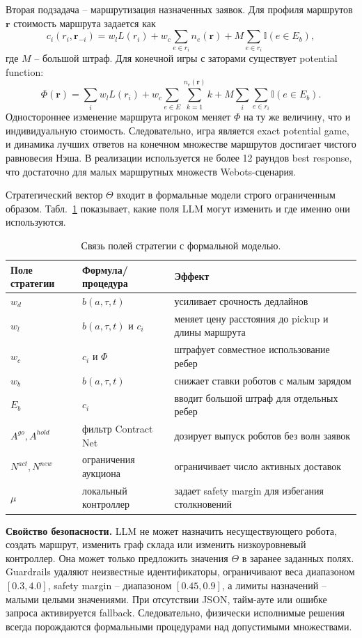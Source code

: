 \documentclass[runningheads]{llncs}
\begin{document}
Вторая подзадача -- маршрутизация назначенных заявок. Для профиля маршрутов $\mathbf r$ стоимость маршрута задается как
\[
c_i(r_i,\mathbf r_{-i}) =
w_l L(r_i)+w_c\sum_{e\in r_i} n_e(\mathbf r)+
M\sum_{e\in r_i}\mathbb{I}(e\in E_b),
\]
где $M$ -- большой штраф. Для конечной игры с заторами существует potential function:
\[
\Phi(\mathbf r)=
\sum_i w_l L(r_i)+
w_c\sum_{e\in E}\sum_{k=1}^{n_e(\mathbf r)}k+
M\sum_i\sum_{e\in r_i}\mathbb{I}(e\in E_b).
\]
Одностороннее изменение маршрута игроком меняет $\Phi$ на ту же величину, что и индивидуальную стоимость. Следовательно, игра является exact potential game, и динамика лучших ответов на конечном множестве маршрутов достигает чистого равновесия Нэша. В реализации используется не более 12 раундов best response, что достаточно для малых маршрутных множеств Webots-сценария.

Стратегический вектор $\Theta$ входит в формальные модели строго ограниченным образом. Табл.~\ref{tab:strategy-map} показывает, какие поля LLM могут изменить и где именно они используются.

\begin{table}[!htbp]
\centering
\caption{Связь полей стратегии с формальной моделью.}
\label{tab:strategy-map}
\scriptsize
\begin{tabular}{p{}p{}p{}}
\toprule
Поле стратегии & Формула/процедура & Эффект \\
\midrule
$w_d$ & $b(a,\tau,t)$ & усиливает срочность дедлайнов \\
$w_l$ & $b(a,\tau,t)$ и $c_i$ & меняет цену расстояния до pickup и длины маршрута \\
$w_c$ & $c_i$ и $\Phi$ & штрафует совместное использование ребер \\
$w_b$ & $b(a,\tau,t)$ & снижает ставки роботов с малым зарядом \\
$E_b$ & $c_i$ & вводит большой штраф для отдельных ребер \\
$A^{go},A^{hold}$ & фильтр Contract Net & дозирует выпуск роботов без волн заявок \\
$N^{act},N^{new}$ & ограничения аукциона & ограничивает число активных доставок \\
$\mu$ & локальный контроллер & задает safety margin для избегания столкновений \\
\bottomrule
\end{tabular}
\end{table}

\noindent\textbf{Свойство безопасности.} LLM не может назначить несуществующего робота, создать маршрут, изменить граф склада или изменить низкоуровневый контроллер. Она может только предложить значения $\Theta$ в заранее заданных полях. Guardrails удаляют неизвестные идентификаторы, ограничивают веса диапазоном $[0.3,4.0]$, safety margin -- диапазоном $[0.45,0.9]$, а лимиты назначений -- малыми целыми значениями. При отсутствии JSON, тайм-ауте или ошибке запроса активируется fallback. Следовательно, физически исполнимые решения всегда порождаются формальными процедурами над допустимыми множествами.
\end{document}
